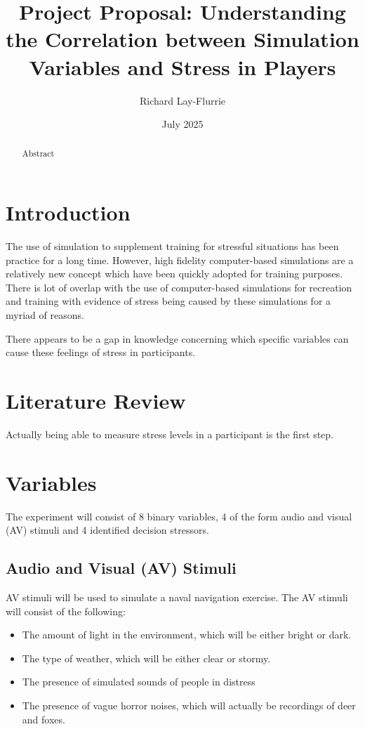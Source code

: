 \documentclass{article}
\title{Project Proposal: Understanding the Correlation between Simulation Variables and Stress in Players}
\author{Richard Lay-Flurrie}
\date{July 2025}
\begin{document}
\maketitle

\begin{abstract}
    Abstract
\end{abstract}

\section{Introduction}

The use of simulation to supplement training for stressful situations has been practice for a long time. However, high fidelity computer-based simulations are a relatively new concept which have been quickly adopted for training purposes. There is lot of overlap with the use of computer-based simulations for recreation and training with evidence of stress being caused by these simulations for a myriad of reasons. 

There appears to be a gap in knowledge concerning which specific variables can cause these feelings of stress in participants. 

\section{Literature Review}

Actually being able to measure stress levels in a participant is the first step. 



\section{Variables}

The experiment will consist of 8 binary variables, 4 of the form audio and visual (AV) stimuli and 4 identified decision stressors.

\subsection{Audio and Visual (AV) Stimuli}

AV stimuli will be used to simulate a naval navigation exercise. The AV stimuli will consist of the following:

\begin{itemize}
    \item The amount of light in the environment, which will be either bright or dark.
    \item The type of weather, which will be either clear or stormy.
    \item The presence of simulated sounds of people in distress
    \item The presence of vague horror noises, which will actually be recordings of deer and foxes.
\end{itemize}
\end{document}
